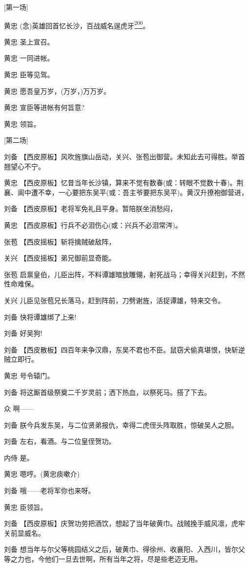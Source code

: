 {[}第一场{]}

黄忠
(念)英雄回首忆长沙，百战威名逞虎牙\protect\hyperlink{fn200}{\textsuperscript{200}}。

黄忠 圣上宣召。

黄忠 一同进帐。

黄忠 臣等见驾。

黄忠 愿吾皇万岁，(万岁，)万万岁。

黄忠 宣臣等进帐有何旨意?

黄忠 领旨。

{[}第二场{]}

刘备
【西皮原板】风吹旌旗山岳动，关兴、张苞出御营。未知此去可得胜。举首翘望心不宁。

黄忠
【西皮原板】忆昔当年长沙镇，算来不觉有数春(或：转眼不觉数十春)。荆襄、阆中遭不幸，一心要把东吴平(或：吾主爷要把东吴平)。黄汉升撩袍御营进，

刘备 【西皮原板】老将军免礼且平身。暂陪朕坐消愁闷，

黄忠 【西皮原板】行兵不必泪伤心(或：兴兵不必泪常涔)。

张苞 【西皮摇板】斩将擒贼破敌阵，

关兴 【西皮摇板】弟兄御前显奇能。

张苞
启禀皇伯，儿臣出阵，不料谭雄暗放雕翎，射死战马；幸得关兴赶到，不然性命难保。

关兴 儿臣见张苞兄长落马，赶到阵前，刀劈谢旌，活捉谭雄，特来交令。

刘备 快将谭雄绑了上来!

刘备 好吴狗!

刘备
【西皮散板】四百年来争汉鼎，东吴不君也不臣。鼠窃犬偷真堪恨，快斩逆贼立即行。

黄忠 号令辕门。

刘备 将这厮首级祭奠二千岁灵前；洒下热血，以祭死马。搭了下去。

众 啊------

刘备 朕今兵发东吴，与二位贤弟报仇，幸得二虎侄头阵取胜，惊破吴人之胆。

刘备 左右，看酒。与二位皇侄贺功。

内侍 是。

黄忠 嗯哼。(黄忠痰嗽介)

刘备 哦------老将军你也来呀。

黄忠 臣领旨。

刘备
【西皮原板】庆贺功劳把酒饮，想起了当年破黄巾。战贼挽手威风凛，虎牢关前显威名。

刘备
想当年与尔父等桃园结义之后，破黄巾、得徐州、收襄阳、入西川，皆尔父等之力也，今他们一旦去世啊，所有当年之将，尽是些老迈无用。

